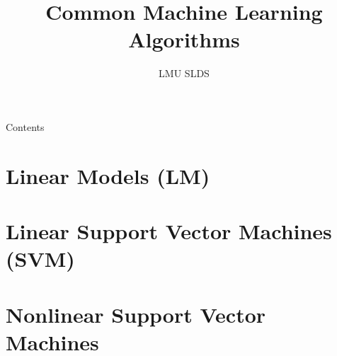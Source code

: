 






\title{Common Machine Learning Algorithms}
\author{LMU SLDS}
\date{}

\newcommand{\titlefigure}{figure_man/waveform}
\newcommand{\titlefiguresize}{1}
\newcommand{\titlefiguresource}{https://www.keysight.com/}
\newcommand{\learninggoals}{
  \item Understand general idea of most important ML algorithms
  \item Learn to choose best-suited algorithm by weighing strengths and 
  weaknesses
  \item Apply algorithms more effectively
}




\lecturechapter{}

\begin{frame}{Contents}
  \tableofcontents
\end{frame}

\footnotesize

\section{Linear Models (LM)}


% 

\section{Linear Support Vector Machines (SVM)}


\section{Nonlinear Support Vector Machines}


